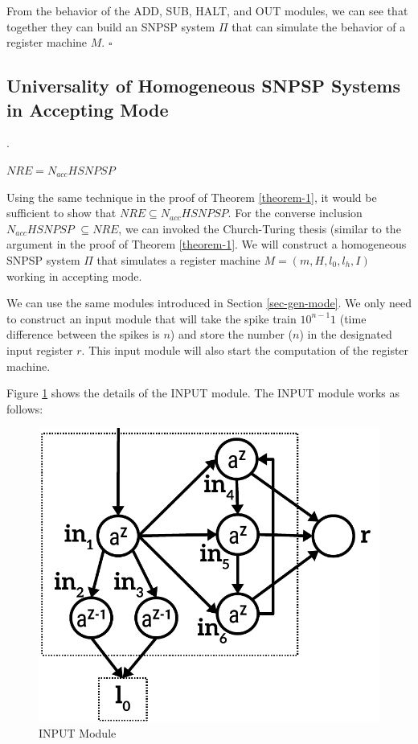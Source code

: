 \documentclass[smallextended]{svjour3}
\begin{document}

From the behavior of the ADD, SUB, HALT, and OUT modules, we can see that together they can build an SNPSP system $\Pi$ that can simulate the
behavior of a register machine $M$. $\square$ 


\subsection{Universality of Homogeneous SNPSP Systems in Accepting Mode}\label{sec-accept}.
\begin{theorem} \label{theorem-2}
$NRE = N_{acc}HSNPSP$ 
\end{theorem}
  
\proof Using the same technique in the proof of Theorem \ref{theorem-1}, it would be sufficient to show that $NRE \subseteq N_{acc}HSNPSP$. For the
converse inclusion $N_{acc}HSNPSP$ $\subseteq NRE$, we can invoked the Church-Turing thesis (similar to the argument in the proof of Theorem 
\ref{theorem-1}. We will construct a homogeneous SNPSP system $\Pi$ that simulates a register machine $M=(m, H, l_0, l_h, I)$ working in accepting mode.

We can use the same modules introduced in Section \ref{sec-gen-mode}. We only need to construct an input module that will take the spike train
$10^{n-1}1$ (time difference between the spikes is $n$) and store the number ($n$) in the designated input register $r$. This input module will
also start the computation of the register machine.

Figure \ref{fig-input} shows the details of the INPUT module. The INPUT module works as follows:

\begin{figure}
\begin{center}
\includegraphics[scale=0.50]{Fig4.pdf}
\caption{INPUT Module}
\label{fig-input}
\end{center}
\end{figure}   
\end{document}
